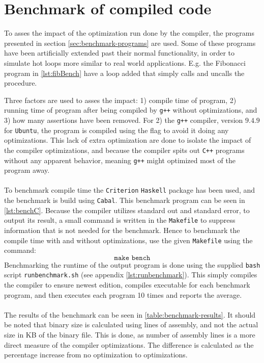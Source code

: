 \section{Benchmark of compiled code}
To asses the impact of the optimization run done by the \lan compiler, the programs
presented in section \ref{sec:benchmark-programs} are used. Some of these programs have been
artificially extended past their normal functionality, in order to simulate hot loops more similar
to real world applications. E.g. the Fibonacci program in \autoref{lst:fibBench} have a loop
added that simply calls and uncalls the  procedure.

Three factors are used to asses the impact: 1) compile time of program, 2) running time of program
after being compiled by \texttt{g++} without optimizations, and 3) how many assertions have been
removed. For 2) the \texttt{g++} compiler, version $9.4.9$ for \texttt{Ubuntu}, the program
is compiled using the flag  to avoid it doing any optimizations. This lack of extra
optimization are done to isolate the impact of the \lan compiler optimizations, and because
the \lan compiler spits out \texttt{C++} programs without any apparent behavior, meaning
\texttt{g++} might optimized most of the program away.
\\
\\
To benchmark compile time the \texttt{Criterion} \texttt{Haskell} package has been used,
and the benchmark is build using \texttt{Cabal}. This benchmark program can be seen in
\autoref{lst:benchC}. Because the \lan compiler utilizes
standard out and standard error, to output its result, a small command is written in the
\texttt{Makefile} to suppress information that is not needed for the benchmark. Hence
to benchmark the compile time with and without optimizations, use the given
\texttt{Makefile} using the command:
$$\texttt{make bench}$$
\noindent
Benchmarking the runtime of the output program is done using the supplied \texttt{bash}
script \texttt{runbenchmark.sh} (see appendix \ref{lst:runbenchmark}). This simply compiles
the \lan compiler to ensure newest edition, compiles executable for each benchmark program,
and then executes each program 10 times and reports the average.
\\
\\
The results of the benchmark can be seen in \autoref{table:benchmark-results}.
It should be noted that binary size is calculated using lines of assembly, and not the
actual size in KB of the binary file. This is done, as number of assembly lines is a
more direct measure of the \lan compiler optimizations. The difference is calculated as
the percentage increase from no optimization to optimizations.

